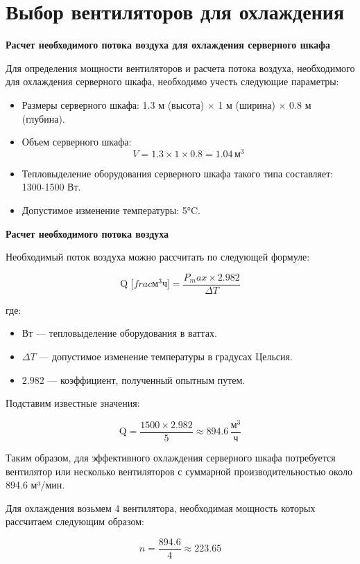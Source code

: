 \section {Выбор вентиляторов для охлаждения}

\textbf{Расчет необходимого потока воздуха для охлаждения серверного шкафа}

Для определения мощности вентиляторов и расчета потока воздуха, необходимого для охлаждения серверного шкафа, необходимо учесть следующие параметры:

\begin{itemize}
    \item Размеры серверного шкафа: 1.3 м (высота) $\times$ 1 м (ширина) $\times$ 0.8 м (глубина).
    \item Объем серверного шкафа: 
    \[
    V = 1.3 \times 1 \times 0.8 = 1.04 \, \text{м}^3
    \]
    \item Тепловыделение оборудования серверного шкафа такого типа составляет: 1300-1500 Вт.
    \item Допустимое изменение температуры: 5°C.
\end{itemize}

\textbf{Расчет необходимого потока воздуха}

Необходимый поток воздуха можно рассчитать по следующей формуле:

\[
\text{Q [}frac{\text{м}^3}{\text{ч}}\text{]} = \frac{P_max \times 2.982}{\Delta T}
\]

где:
\begin{itemize}
    \item Вт — тепловыделение оборудования в ваттах.
    \item $\Delta T$ — допустимое изменение температуры в градусах Цельсия.
    \item $2.982$ — коэффициент, полученный опытным путем.
\end{itemize}

Подставим известные значения:

\[
\text{Q} = \frac{1500 \times 2.982}{5} \approx 894.6 \, \frac{\text{м}^3}{\text{ч}}
\]

Таким образом, для эффективного охлаждения серверного шкафа потребуется вентилятор или несколько вентиляторов с суммарной производительностью около 894.6 м³/мин.

Для охлаждения возьмем 4 вентилятора, необходимая мощность которых рассчитаем следующим образом:

\[
 n = \frac{894.6}{4} \approx 223.65
\]

